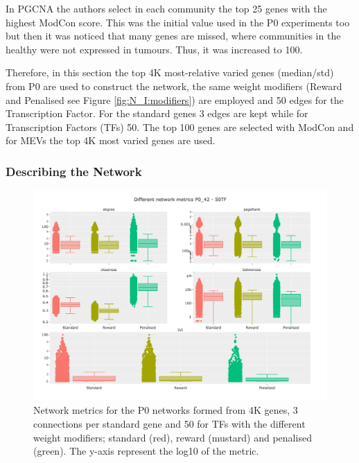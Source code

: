 In PGCNA \citet{Care2019-ij} the authors select in each community the top 25 genes with the highest ModCon score. This was the initial value used in the P0 experiments too but then it was noticed that many genes are missed, where communities in the healthy were not expressed in tumours. Thus, it was increased to 100.

Therefore, in this section the top 4K most-relative varied genes (median/std) from P0 are used to construct the network, the same weight modifiers (Reward and Penalised see Figure \ref{fig:N_I:modifiers}) are employed and 50 edges for the Transcription Factor. For the standard genes 3 edges are kept while for Transcription Factors (TFs) 50. The top 100 genes are selected with ModCon and for MEVs the top 4K most varied genes are used.

\subsubsection{Describing the Network}


\begin{figure}[!htb]    
    \centering
    \includegraphics[width=1.0\textwidth,height=0.7\textheight,keepaspectratio]{Sections/Network_I/Resources/P0/P0_NetworkMetricsComp_50TF_2.png}
    \caption{Network metrics for the P0 networks formed from 4K genes, 3 connections per standard gene and 50 for TFs with the different weight modifiers; standard (red), reward (mustard) and penalised (green). The y-axis represent the log10 of the metric. }
    \label{fig:N_I:net_metrics_p0}
\end{figure}


